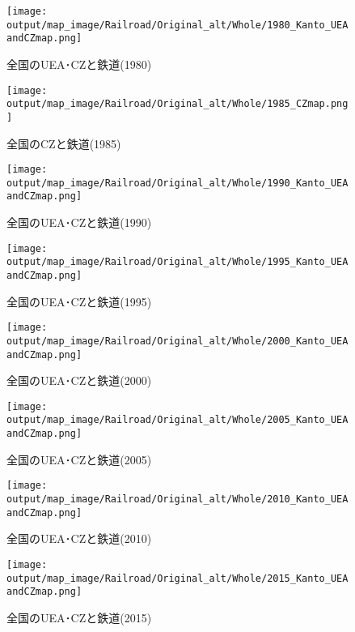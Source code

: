 \documentclass{ltjsarticle}
\begin{document}
\begin{figure}[pbth]
  \centering
  \texttt{[image: output/map\_image/Railroad/Original\_alt/Whole/1980\_Kanto\_UEAandCZmap.png]}
  \caption{\label{alt:1980:allCZandUEA:Rail}全国のUEA･CZと鉄道(1980)}
\end{figure}


\begin{figure}[pbth]
  \centering
  \texttt{[image: output/map\_image/Railroad/Original\_alt/Whole/1985\_CZmap.png]}
  \caption{\label{alt:1985:allCZandUEA:Rail}全国のCZと鉄道(1985)}
\end{figure}


\begin{figure}[pbth]
  \centering
  \texttt{[image: output/map\_image/Railroad/Original\_alt/Whole/1990\_Kanto\_UEAandCZmap.png]}
  \caption{\label{alt:1990:allCZandUEA:Rail}全国のUEA･CZと鉄道(1990)}
\end{figure}


\begin{figure}[pbth]
  \centering
  \texttt{[image: output/map\_image/Railroad/Original\_alt/Whole/1995\_Kanto\_UEAandCZmap.png]}
  \caption{\label{alt:1995:allCZandUEA:Rail}全国のUEA･CZと鉄道(1995)}
\end{figure}


\begin{figure}[pbth]
  \centering
  \texttt{[image: output/map\_image/Railroad/Original\_alt/Whole/2000\_Kanto\_UEAandCZmap.png]}
  \caption{\label{alt:2000:allCZandUEA:Rail}全国のUEA･CZと鉄道(2000)}
\end{figure}


\begin{figure}[pbth]
  \centering
  \texttt{[image: output/map\_image/Railroad/Original\_alt/Whole/2005\_Kanto\_UEAandCZmap.png]}
  \caption{\label{alt:2005:allCZandUEA:Rail}全国のUEA･CZと鉄道(2005)}
\end{figure}


\begin{figure}[pbth]
  \centering
  \texttt{[image: output/map\_image/Railroad/Original\_alt/Whole/2010\_Kanto\_UEAandCZmap.png]}
  \caption{\label{alt:2010:allCZandUEA:Rail}全国のUEA･CZと鉄道(2010)}
\end{figure}


\begin{figure}[pbth]
  \centering
  \texttt{[image: output/map\_image/Railroad/Original\_alt/Whole/2015\_Kanto\_UEAandCZmap.png]}
  \caption{\label{alt:2015:allCZandUEA:Rail}全国のUEA･CZと鉄道(2015)}
\end{figure}
\end{document}
